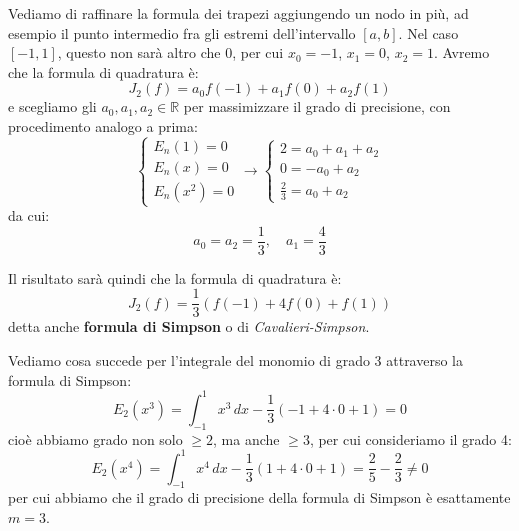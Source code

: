 \documentclass[a4paper,11pt]{article}
\begin{document}
Vediamo di raffinare la formula dei trapezi aggiungendo un nodo in più, ad esempio il punto intermedio fra gli estremi dell'intervallo $[a, b]$.
Nel caso $[-1, 1]$, questo non sarà altro che $0$, per cui $x_0 = -1$, $x_1 = 0$, $x_2 = 1$.
Avremo che la formula di quadratura è:
$$
J_2 (f) = a_0 f(-1) + a_1 f(0) + a_2 f(1)
$$
e scegliamo gli $a_0, a_1, a_2 \in \mathbb{R}$ per massimizzare il grado di precisione, con procedimento analogo a prima:
$$
	\begin{cases}
		E_n(1) = 0 \\	
		E_n(x) = 0 \\	
		E_n(x^2) = 0	
	\end{cases}
	\rightarrow
	\begin{cases}
		2 = a_0 + a_1 + a_2 \\
		0 = -a_0 + a_2 \\
		\frac{2}{3} = a_0 + a_2
	\end{cases}
$$
da cui:
$$
a_0 = a_2 = \frac{1}{3}, \quad a_1 = \frac{4}{3}
$$

Il risultato sarà quindi che la formula di quadratura è:
$$
J_2(f) = \frac{1}{3} \left( f(-1) + 4 f(0) + f(1) \right)
$$
detta anche \textbf{formula di Simpson} o di \textit{Cavalieri-Simpson}.

Vediamo cosa succede per l'integrale del monomio di grado 3 attraverso la formula di Simpson:
$$
E_2 (x^3) = \int_{-1}^1 x^3 \, dx - \frac{1}{3} \left( -1 + 4 \cdot 0 + 1 \right) = 0
$$
cioè abbiamo grado non solo $\geq 2$, ma anche $\geq 3$, per cui consideriamo il grado 4:
$$
E_2 (x^4) = \int_{-1}^1 x^4 \, dx - \frac{1}{3} \left( 1 + 4 \cdot 0 + 1 \right) = \frac{2}{5} - \frac{2}{3} \neq 0
$$
per cui abbiamo che il grado di precisione della formula di Simpson è esattamente $m = 3$.

\par\smallskip
\end{document}
